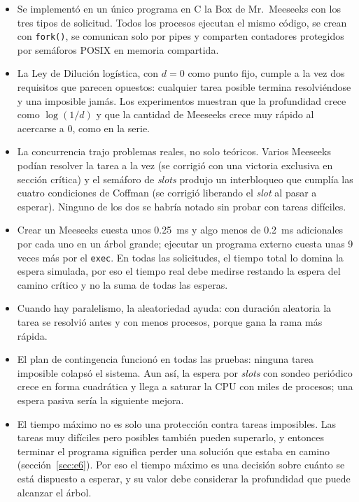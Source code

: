 \begin{itemize}[leftmargin=1.5em]
\item Se implementó en un único programa en C la Box de Mr.\ Meeseeks con los tres tipos de
  solicitud. Todos los procesos ejecutan el mismo código, se crean con \texttt{fork()}, se
  comunican solo por pipes y comparten contadores protegidos por semáforos POSIX en memoria
  compartida.
\item La Ley de Dilución logística, con $d=0$ como punto fijo, cumple a la vez dos
  requisitos que parecen opuestos: cualquier tarea posible termina resolviéndose y una
  imposible jamás. Los experimentos muestran que la profundidad crece como $\log(1/d)$ y que
  la cantidad de Meeseeks crece muy rápido al acercarse a 0, como en la serie.
\item La concurrencia trajo problemas reales, no solo teóricos. Varios Meeseeks podían
  resolver la tarea a la vez (se corrigió con una victoria exclusiva en sección crítica) y el
  semáforo de \emph{slots} produjo un interbloqueo que cumplía las cuatro condiciones de
  Coffman (se corrigió liberando el \emph{slot} al pasar a esperar). Ninguno de los dos se
  habría notado sin probar con tareas difíciles.
\item Crear un Meeseeks cuesta unos 0.25~ms y algo menos de 0.2~ms adicionales por cada uno
  en un árbol grande; ejecutar un programa externo cuesta unas 9 veces más por el
  \texttt{exec}. En todas las solicitudes, el tiempo total lo domina la espera simulada,
  por eso el tiempo real debe medirse restando la espera del camino crítico y no la suma de
  todas las esperas.
\item Cuando hay paralelismo, la aleatoriedad ayuda: con duración aleatoria la tarea se
  resolvió antes y con menos procesos, porque gana la rama más rápida.
\item El plan de contingencia funcionó en todas las pruebas: ninguna tarea imposible colapsó
  el sistema. Aun así, la espera por \emph{slots} con sondeo periódico crece en forma
  cuadrática y llega a saturar la CPU con miles de procesos; una espera pasiva sería la
  siguiente mejora.
\item El tiempo máximo no es solo una protección contra tareas imposibles. Las tareas muy
  difíciles pero posibles también pueden superarlo, y entonces terminar el programa
  significa perder una solución que estaba en camino (sección~\ref{sec:e6}). Por eso el
  tiempo máximo es una decisión sobre cuánto se está dispuesto a esperar, y su valor debe
  considerar la profundidad que puede alcanzar el árbol.
\end{itemize}

